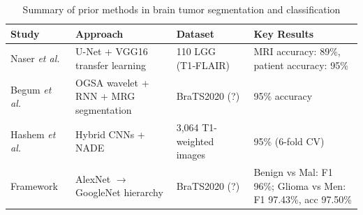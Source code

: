 \begin{table}[ht]
  \centering
  \caption{Summary of prior methods in brain tumor segmentation and classification}
  \label{tab:related-work-summary}
  \begin{tabular}{p{} p{} p{} p{}}
    \hline
    \textbf{Study}                                             & \textbf{Approach} & \textbf{Dataset} & \textbf{Key Results} \\
    \hline
    \vspace{0.1cm} Naser \emph{et al.}~\cite{naser2020glioma}  &
    \vspace{0.1cm} U-Net + VGG16 transfer learning             &
    \vspace{0.1cm} 110 LGG (T1‑FLAIR)                          &
    \vspace{0.1cm} MRI accuracy: 89\%, patient accuracy: 95\%                                                                \\
    \hline
    \vspace{0.1cm} Begum \emph{et al.}~\cite{begum2020wavelet} &
    \vspace{0.1cm} OGSA wavelet + RNN + MRG segmentation       &
    \vspace{0.1cm} BraTS2020 (?)                               &
    \vspace{0.1cm} 95\% accuracy                                                                                             \\
    \hline
    \vspace{0.1cm} Hashem \emph{et al.}~\cite{hashem2020nade}  &
    \vspace{0.1cm} Hybrid CNNs + NADE                          &
    \vspace{0.1cm} 3,064 T1-weighted images                    &
    \vspace{0.1cm} 95\% (6-fold CV)                                                                                          \\
    \hline
    \vspace{0.1cm} Framework~\cite{kulkarni2020framework}      &
    \vspace{0.1cm} AlexNet $\to$ GoogleNet hierarchy           &
    \vspace{0.1cm} BraTS2020 (?)                               &
    \vspace{0.1cm} Benign vs Mal: F1 96\%;
    \vspace{0.1cm} Glioma vs Men: F1 97.43\%, acc 97.50\%                                                                    \\

\end{tabular}
\end{table}

